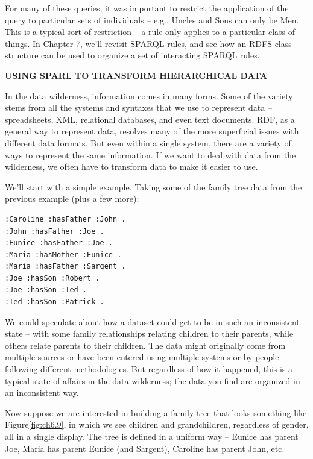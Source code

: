 For many of these queries, it was important to restrict the application
of the query to particular sets of individuals -- e.g., Uncles and Sons
can only be Men. This is a typical sort of restriction -- a rule only
applies to a particular class of things. In Chapter 7, we'll revisit
SPARQL rules, and see how an RDFS class structure can be used to
organize a set of interacting SPARQL rules.


\begin{challenge}
\textbf{USING SPARL TO TRANSFORM HIERARCHICAL DATA}
\label{chal:2}


In the data wilderness, information comes in many forms. Some of the
variety stems from all the systems and syntaxes that we use to represent
data -- spreadsheets, XML, relational databases, and even text
documents. RDF, as a general way to represent data, resolves many of the
more superficial issues with different data formats. But even within a
single system, there are a variety of ways to represent the same
information. If we want to deal with data from the wilderness, we often
have to transform data to make it easier to use.

We'll start with a simple example. Taking some of the family tree data
from the previous example (plus a few more):

\begin{lstlisting}
:Caroline :hasFather :John .
:John :hasFather :Joe .
:Eunice :hasFather :Joe .
:Maria :hasMother :Eunice .
:Maria :hasFather :Sargent .
:Joe :hasSon :Robert .
:Joe :hasSon :Ted .
:Ted :hasSon :Patrick .
\end{lstlisting}

We could speculate about how a dataset could get to be in such an
inconsistent state -- with some family relationships relating children
to their parents, while others relate parents to their children. The
data might originally come from multiple sources or have been entered
using multiple systems or by people following different methodologies.
But regardless of how it happened, this is a typical state of affairs in
the data wilderness; the data you find are organized in an inconsistent
way.

Now suppose we are interested in building a family tree that looks
something like Figure\ref{fig:ch6.9}, in which we see children and grandchildren,
regardless of gender, all in a single display. The tree is defined in a
uniform way -- Eunice has parent Joe, Maria has parent Eunice (and
Sargent), Caroline has parent John, etc.


\end{challenge}
